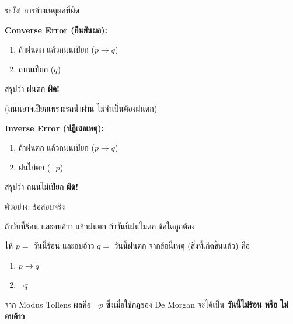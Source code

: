 \documentclass[11pt, aspectratio=169]{beamer}
\begin{document}
\begin{frame}{ระวัง! การอ้างเหตุผลที่ผิด}
  \begin{exambox}
    \textbf{Converse Error (ยืนยันผล):}
    \begin{enumerate}
      \item ถ้าฝนตก แล้วถนนเปียก \quad ($p \to q$)
      \item ถนนเปียก \quad ($q$)
    \end{enumerate}
    สรุปว่า ฝนตก \quad \textbf{ผิด!}

    \medskip
    (ถนนอาจเปียกเพราะรถนํ้าผ่าน ไม่จำเป็นต้องฝนตก)

    \medskip
    \textbf{Inverse Error (ปฏิเสธเหตุ):}
    \begin{enumerate}
      \item ถ้าฝนตก แล้วถนนเปียก \quad ($p \to q$)
      \item ฝนไม่ตก \quad ($\lnot p$)
    \end{enumerate}
    สรุปว่า ถนนไม่เปียก \quad \textbf{ผิด!}
  \end{exambox}
\end{frame}

\begin{frame}{ตัวอย่าง: ข้อสอบจริง}
  \begin{exambox}[ข้อสอบปี 67 ข้อ 17]
    ถ้าวันนี้ร้อน และอบอ้าว แล้วฝนตก ถ้าวันนี้ฝนไม่ตก ข้อใดถูกต้อง
  \end{exambox}

  \begin{solbox}[วิธีทำ]
    ให้ $p = $ วันนี้ร้อน และอบอ้าว $q = $ วันนี้ฝนตก \newline
    จากข้อนี้เหตุ (สิ่งที่เกิดขึ้นแล้ว) คือ 
    \begin{enumerate}
      \item $p \rightarrow q$
      \item $\lnot q$
    \end{enumerate}
    จาก Modus Tollens ผลคือ $\lnot p$ ซึ่งเมื่อใช้กฎของ De Morgan จะได้เป็น \textbf{วันนี้ไม่ร้อน หรือ ไม่อบอ้าว}
  \end{solbox}
\end{frame}
\end{document}
